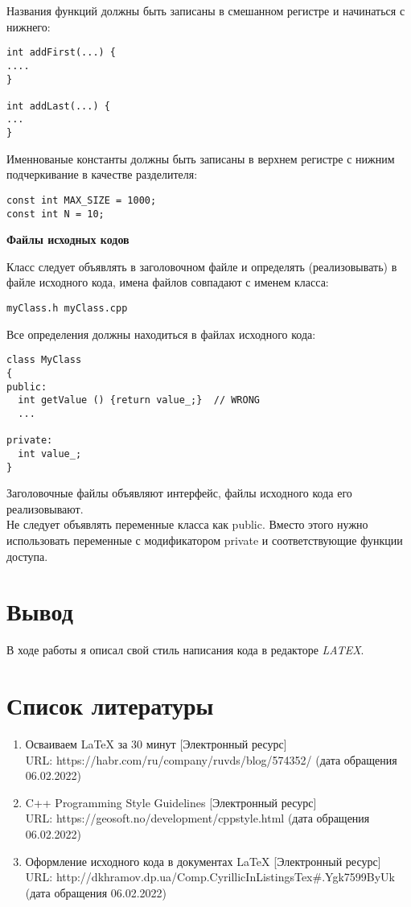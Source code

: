\documentclass[12pt]{article}
\begin{document}
Названия функций должны быть записаны в смешанном регистре и начинаться с нижнего:
\begin{lstlisting}
int addFirst(...) {
....
}

int addLast(...) {
...
}
\end{lstlisting}

Именнованые константы должны быть записаны в верхнем регистре с нижним подчеркивание в качестве разделителя:
\begin{lstlisting}
const int MAX_SIZE = 1000;
const int N = 10;
\end{lstlisting}
\textbf{Файлы исходных кодов}

 Класс следует объявлять в заголовочном файле и определять (реализовывать) в файле исходного кода, имена файлов совпадают с именем класса:
\begin{lstlisting}
myClass.h myClass.cpp
\end{lstlisting}

Все определения должны находиться в файлах исходного кода:
\begin{lstlisting}
class MyClass
{
public:
  int getValue () {return value_;}  // WRONG
  ...

private:
  int value_;
}
\end{lstlisting}
Заголовочные файлы объявляют интерфейс, файлы исходного кода его реализовывают.
\\Не следует объявлять переменные класса как public. Вместо этого нужно использовать переменные с модификатором private и соответствующие
функции доступа.

\section{Вывод}
В ходе работы я описал свой стиль написания кода в редакторе \textit{LATEX}.

\section{Список литературы}

\begin{enumerate}
    \item Осваиваем LaTeX за 30 минут [Электронный ресурс] \\URL: https://habr.com/ru/company/ruvds/blog/574352/ (дата обращения 06.02.2022)
    \item C++ Programming Style Guidelines [Электронный ресурс] \\URL: https://geosoft.no/development/cppstyle.html (дата обращения 06.02.2022)
    \item Оформление исходного кода в документах LaTeX [Электронный ресурс] \\URL: http://dkhramov.dp.ua/Comp.CyrillicInListingsTex#.Ygk7599ByUk (дата обращения 06.02.2022)
\end{enumerate}
\end{document}
